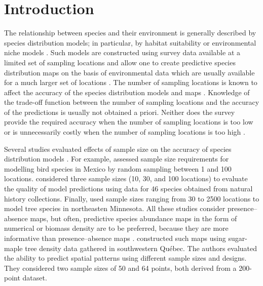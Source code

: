 \documentclass[review]{elsarticle}
\begin{document}
\linenumbers

\section{Introduction}

The relationship between species and their environment is generally described
by species distribution models; in particular, by habitat suitability or environmental niche models \citep{guisan2005}. Such models are constructed using survey data available at a limited set of sampling locations and allow one to create predictive species distribution maps on the basis of environmental data which are usually available for a much larger set of locations \citep{guisan2000}. The number of sampling locations is known to affect the accuracy of the species distribution models and maps \citep{stockwell2002, wisz2008}.  Knowledge of the trade-off function between the number of sampling locations and the accuracy of the predictions is usually not obtained a priori. Neither does the survey provide the required accuracy when the number of sampling locations is too low or is unnecessarily costly when the number of sampling locations is too high \citep{caughlan2001,reynolds2011}.

Several studies evaluated effects of sample size on the accuracy of species distribution models \citep{stockwell2002,pearson2007,wisz2008,hanberry2012}. For example, \citet{stockwell2002} assessed sample size requirements for modelling bird species in Mexico by random sampling between 1 and 100 locations. \citet{wisz2008} considered three sample sizes (10, 30, and 100 locations) to evaluate the quality of model predictions using data for 46 species obtained from natural history collections. Finally, \citet{hanberry2012} used sample sizes ranging from 30 to 2500 locations to model tree species in northeasten  Minnesota. All these studies consider presence--absence maps, but often, predictive species abundance maps in the form of numerical or biomass density are to be preferred,  because they are more informative than presence--absence maps \citep{vieira2012, cozzi2013}.  \citet{fortin1989} constructed such maps using sugar-maple tree density data gathered in  southwestern Qu\'{e}bec.  The authors evaluated the ability to predict spatial patterns using different sample sizes and designs. They considered two sample sizes of 50 and 64 points, both derived from a 200-point dataset.
\end{document}
